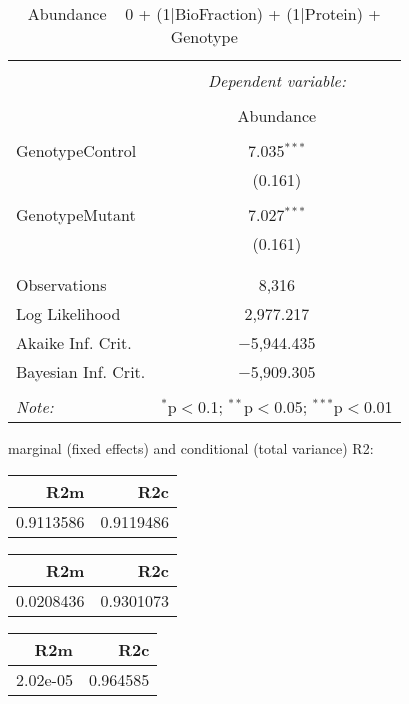 \documentclass[11pt]{report}
\begin{document}
\begin{table}[!htbp] \centering 
  \caption{Abundance ~ 0 + (1|BioFraction) + (1|Protein) + Genotype} 
  \label{} 
\begin{tabular}{@{\extracolsep{5pt}}lc} 
\\[-1.8ex]\hline 
\hline \\[-1.8ex] 
 & \multicolumn{1}{c}{\textit{Dependent variable:}} \\ 
\cline{2-2} 
\\[-1.8ex] & Abundance \\ 
\hline \\[-1.8ex] 
 GenotypeControl & 7.035$^{***}$ \\ 
  & (0.161) \\ 
  & \\ 
 GenotypeMutant & 7.027$^{***}$ \\ 
  & (0.161) \\ 
  & \\ 
\hline \\[-1.8ex] 
Observations & 8,316 \\ 
Log Likelihood & 2,977.217 \\ 
Akaike Inf. Crit. & $-$5,944.435 \\ 
Bayesian Inf. Crit. & $-$5,909.305 \\ 
\hline 
\hline \\[-1.8ex] 
\textit{Note:}  & \multicolumn{1}{r}{$^{*}$p$<$0.1; $^{**}$p$<$0.05; $^{***}$p$<$0.01} \\ 
\end{tabular} 
\end{table} 
marginal (fixed effects) and conditional (total variance) R2:

\begin{tabular}{r|r}
\hline
R2m & R2c\\
\hline
0.9113586 & 0.9119486\\
\hline
\end{tabular}

\begin{tabular}{r|r}
\hline
R2m & R2c\\
\hline
0.0208436 & 0.9301073\\
\hline
\end{tabular}

\begin{tabular}{r|r}
\hline
R2m & R2c\\
\hline
2.02e-05 & 0.964585\\
\hline
\end{tabular}
\end{document}

